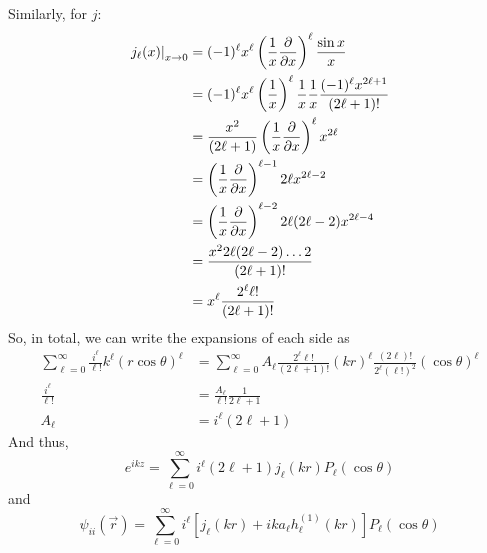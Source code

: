 \documentclass[a4paper]{article}
\begin{document}
Similarly, for $j$:
\begin{align*}
	\left. j_\ell(x) \right|_{x\to 0} &= (-1)^\ell x^\ell
		\left(\frac{1}{x}\pd{x}\right)^\ell \frac{\sin x}{x}\\
	&= (-1)^\ell x^\ell \left(\frac{1}{x}\right)^\ell\frac{1}{x}
		\frac{1}{x}\frac{(-1)^\ell x^{2\ell+1}}{(2\ell+1)!}\\
	&= \frac{x^2}{(2\ell+1)}\left(\frac{1}{x}\pd{x}\right)^\ell x^{2\ell}\\
	&= \left(\frac{1}{x}\pd{x}\right)^{\ell-1}2\ell x^{2\ell-2}\\
	&= \left(\frac{1}{x}\pd{x}\right)^{\ell-2}2\ell(2\ell-2) x^{2\ell-4}\\
	&= \frac{x^2 2\ell(2\ell-2)\ldots2}{(2\ell+1)!}\\
	&= x^\ell\frac{2^\ell \ell!}{(2\ell+1)!}
\end{align*}
So, in total, we can write the expansions of each side as
\begin{align*}
	\sum_{\ell=0}^\infty \frac{i^\ell}{\ell!}k^\ell(r\cos\theta)^\ell &=
	\sum_{\ell=0}^\infty A_\ell\frac{2^\ell \ell!}{(2\ell+1)!}(kr)^\ell
		\frac{(2\ell)!}{2^\ell(\ell!)^2}(\cos\theta)^\ell\\
	\frac{i^\ell}{\ell!} &= \frac{A_\ell}{\ell!}\frac{1}{2\ell+1}\\
	A_\ell &= i^\ell (2\ell+1)
\end{align*}
And thus,
\[
	e^{ikz} = \sum_{\ell=0}^\infty
	i^\ell(2\ell+1)j_\ell(kr)P_\ell(\cos\theta)
\]
and
\[
	\psi_{ii}(\vec{r}) = \sum_{\ell=0}^\infty i^\ell\left[
	j_\ell(kr) + ika_\ell h^{(1)}_\ell(kr)\right] P_\ell(\cos\theta)
\]
\end{document}
